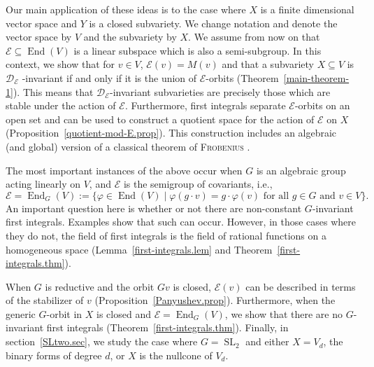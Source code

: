 \documentclass{amsart}
\theoremstyle{definition}
\theoremstyle{remark}
\begin{document}
Our main application of these ideas is to the case where $X$ is a finite
dimensional vector space and $Y$ is a closed subvariety. We change notation
and denote the vector space by $V$ and the subvariety by $X$. We assume from
now on that ${\mathcal E}{\subseteq} \operatorname{End}(V)$ is a linear subspace which is also a
semi-subgroup. In this context, we show that for $v\in V$, ${\mathcal E}(v)=M(v)$ and
that a subvariety $X{\subseteq} V$ is ${\mathcal D}_{\mathcal E}$ -invariant if and only if
it is the union of ${\mathcal E}$-orbits (Theorem~\ref{main-theorem-1}). This means that ${\mathcal D}_{\mathcal E}$-invariant 
subvarieties are precisely those which are stable under the action of ${\mathcal E}$. Furthermore,
first integrals separate ${\mathcal E}$-orbits on an open set and can be used to
construct a quotient space for the action of ${\mathcal E}$ on $X$ (Proposition~\ref{quotient-mod-E.prop}).
This construction includes an algebraic (and global) version of a classical
theorem of {\textsc{{Frobenius}\/}}  \cite[Theorem 1.60]{Wa1971Foundations-of-dif}.

The most important instances of the above occur when $G$ is an algebraic
group acting linearly on $V$, and ${\mathcal E}$ is the semigroup of covariants, i.e., 
$$
{\mathcal E}=\operatorname{End}_{G}(V) :=
\{{\varphi}\in \operatorname{End}(V)\mid {\varphi}(g\cdot v) = g \cdot {\varphi}(v)\text{ for all } g\in G \text{ and } v\in V\}.
$$ 
An important question here is whether or not there are non-constant $G$-invariant
first integrals. Examples show that such can occur. However, in those cases
where they do not, the field of first integrals is the field of rational
functions on a homogeneous space (Lemma~\ref{first-integrals.lem} and Theorem~\ref{first-integrals.thm}).

When $G$ is reductive and the orbit $Gv$ is closed, ${\mathcal E}(v)$ can be described in
terms of the stabilizer of $v$ (Proposition~\ref{Panyushev.prop}). Furthermore, when the
generic $G$-orbit in $X$ is closed and ${\mathcal E}=\operatorname{End}_{G}(V)$, we show that there are
no $G$-invariant first integrals (Theorem~\ref{first-integrals.thm}). Finally, in section~\ref{SLtwo.sec}, we study the
case where $G={\operatorname{SL}_{2}}$ and either $X=V_{d}$,  the binary forms of degree
$d$, or $X$ is the nullcone of $V_{d}$.
\end{document}
